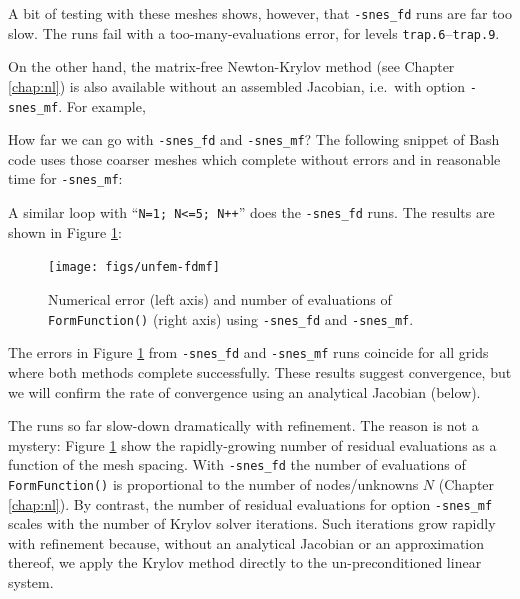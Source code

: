 A bit of testing with these meshes shows, however, that \texttt{-snes\_fd} runs are far too slow.  The runs fail with a too-many-evaluations error, for levels \texttt{trap.6}--\texttt{trap.9}.

On the other hand, the matrix-free Newton-Krylov method (see Chapter \ref{chap:nl}) is also available without an assembled Jacobian, i.e.~with option \texttt{-snes\_mf}.  For example, 

How far we can go with \texttt{-snes\_fd} and \texttt{-snes\_mf}?  The following snippet of Bash code uses those coarser meshes which complete without errors and in reasonable time for \texttt{-snes\_mf}:
A similar loop with ``\texttt{N=1; N<=5; N++}'' does the \texttt{-snes\_fd} runs.  The results are shown in Figure \ref{fig:un:unfem-fdmf}:

\begin{figure}
\texttt{[image: figs/unfem-fdmf]}
\caption{Numerical error (left axis) and number of evaluations of \texttt{FormFunction()} (right axis) using \texttt{-snes\_fd} and \texttt{-snes\_mf}.}
\label{fig:un:unfem-fdmf}
\end{figure}

The errors in Figure \ref{fig:un:unfem-fdmf} from \texttt{-snes\_fd} and  \texttt{-snes\_mf} runs coincide for all grids where both methods complete successfully.  These results suggest convergence, but we will confirm the rate of convergence using an analytical Jacobian (below).

The runs so far slow-down dramatically with refinement.  The reason is not a mystery: Figure \ref{fig:un:unfem-fdmf} show the rapidly-growing number of residual evaluations as a function of the mesh spacing.  With \texttt{-snes\_fd} the number of evaluations of \texttt{FormFunction()} is proportional to the number of nodes/unknowns $N$ (Chapter \ref{chap:nl}).  By contrast, the number of residual evaluations for option \texttt{-snes\_mf} scales with the number of Krylov solver iterations.  Such iterations grow rapidly with refinement because, without an analytical Jacobian or an approximation thereof, we apply the Krylov method directly to the un-preconditioned linear system.


